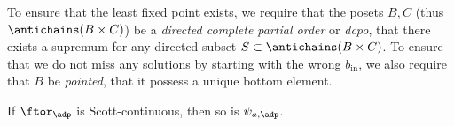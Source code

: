 



To ensure that the least fixed point exists, we require that the posets $B, C$ (thus $\antichains (B \times C)$) be a \emph{directed complete partial order} or \emph{dcpo}, \ie  that there exists a supremum for any directed subset $S \subset \antichains (B \times C)$.
To ensure that we do not miss any solutions by starting with the wrong $b_{\text{in}}$, we also require that $B$ be \emph{pointed}, \ie  that it possess a unique bottom element.


\begin{lemma}
    If $\ftor_\adp$ is Scott-continuous, then so is $\psi_{a,\adp}$.
\end{lemma}

